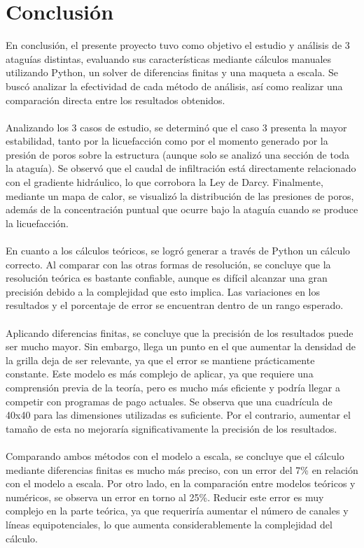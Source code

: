 \part{Conclusión}

En conclusión, el presente proyecto tuvo como objetivo el estudio y análisis de 3 ataguías distintas, evaluando sus características mediante cálculos manuales utilizando Python, un solver de diferencias finitas y una maqueta a escala. Se buscó analizar la efectividad de cada método de análisis, así como realizar una comparación directa entre los resultados obtenidos. 
\\ \\
Analizando los 3 casos de estudio, se determinó que el caso 3 presenta la mayor estabilidad, tanto por la licuefacción como por el momento generado por la presión de poros sobre la estructura (aunque solo se analizó una sección de toda la ataguía). Se observó que el caudal de infiltración está directamente relacionado con el gradiente hidráulico, lo que corrobora la Ley de Darcy. Finalmente, mediante un mapa de calor, se visualizó la distribución de las presiones de poros, además de la concentración puntual que ocurre bajo la ataguía cuando se produce la licuefacción.
\\ \\
En cuanto a los cálculos teóricos, se logró generar a través de Python un cálculo correcto. Al comparar con las otras formas de resolución, se concluye que la resolución teórica es bastante confiable, aunque es difícil alcanzar una gran precisión debido a la complejidad que esto implica. Las variaciones en los resultados y el porcentaje de error se encuentran dentro de un rango esperado.
\\ \\
Aplicando diferencias finitas, se concluye que la precisión de los resultados puede ser mucho mayor. Sin embargo, llega un punto en el que aumentar la densidad de la grilla deja de ser relevante, ya que el error se mantiene prácticamente constante. Este modelo es más complejo de aplicar, ya que requiere una comprensión previa de la teoría, pero es mucho más eficiente y podría llegar a competir con programas de pago actuales. Se observa que una cuadrícula de 40x40 para las dimensiones utilizadas es suficiente. Por el contrario, aumentar el tamaño de esta no mejoraría significativamente la precisión de los resultados.
\\ \\
Comparando ambos métodos con el modelo a escala, se concluye que el cálculo mediante diferencias finitas es mucho más preciso, con un error del 7\% en relación con el modelo a escala. Por otro lado, en la comparación entre modelos teóricos y numéricos, se observa un error en torno al 25\%. Reducir este error es muy complejo en la parte teórica, ya que requeriría aumentar el número de canales y líneas equipotenciales, lo que aumenta considerablemente la complejidad del cálculo.
